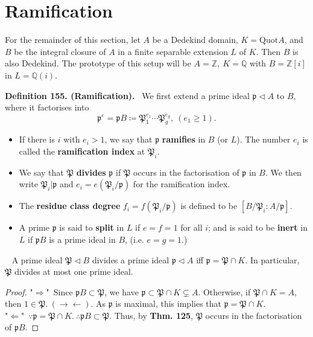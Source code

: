 \documentclass[12pt,a4paper,footinclude=true,headinclude=true]{scrbook} %
\newenvironment{lemma}[2][]
{\renewcommand\theinnercustomlemma{#2}\innercustomlemma[#1]
\begin{mdframed}[backgroundcolor=gray!20]\ }
{\end{mdframed}\endinnercustomprop}
\newenvironment{definition}[2][Definition]
    { \begin{mdframed}[backgroundcolor=gray!20] \textbf{#1 #2.}\ }
    {  \end{mdframed}}
\begin{document}
\section{Ramification}
For the remainder of this section, let $A$ be a Dedekind domain, $K=\mathrm{Quot}A$, and $B$ be the integral closure of $A$ in a finite separable extension $L$ of $K$. Then $B$ is also Dedekind. The prototype of this setup will be $A=\mathbb{Z},\ K=\mathbb{Q}$ with $B=\mathbb{Z}[i]$ in $L=\mathbb{Q}(i)$.

\begin{definition}{155. (Ramification)}
    We first extend a prime ideal $\mathfrak{p}\triangleleft A$ to $B$, where it factorises into 
    \begin{equation*}
        \mathfrak{p}^e=\mathfrak{p}B\coloneqq\mathfrak{P}_1^{e_1}\cdots
        \mathfrak{P}_g^{e_g},\ (e_1\geq1).
    \end{equation*}
    \begin{itemize}
        \item If there is $i$ with $e_i>1$, we say that $\mathfrak{p}$ \textbf{ramifies} in $B$ (or $L$). The number $e_i$ is called the \textbf{ramification index} at $\mathfrak{P}_i$.
        \item We say that $\mathfrak{P}$ \textbf{divides} $\mathfrak{p}$ if $\mathfrak{P}$ occurs in the factorisation of $\mathfrak{p}$ in $B$. We then write $\mathfrak{P}_i|\mathfrak{p}$ and $e_i=e(\mathfrak{P}_i/\mathfrak{p})$ for the ramification index. 
        \item The \textbf{residue class degree} $f_i=f(\mathfrak{P}_i/\mathfrak{p})$ is defined to be $[B/\mathfrak{P}_i:A/\mathfrak{p}]$.
        \item A prime $\mathfrak{p}$ is said to \textbf{split} in $L$ if $e=f=1$ for all $i$; and is said to be \textbf{inert} in $L$ if $\mathfrak{p}B$ is a prime ideal in $B$, (i.e. $e=g=1$.)
    \end{itemize}
\end{definition} 

\begin{lemma}{157}
    A prime ideal $\mathfrak{P}\triangleleft B$ divides a prime ideal $\mathfrak{p}\triangleleft A$ iff $\mathfrak{p}=\mathfrak{P}\cap K$. In particular, $\mathfrak{P}$ divides at most one prime ideal.
\end{lemma}
\begin{proof}
    "$\Rightarrow$"\ Since $\mathfrak{p}B\subset\mathfrak{P}$, we have $\mathfrak{p}\subset\mathfrak{P}\cap K\subsetneq A$. Otherwise, if $\mathfrak{P}\cap K=A$, then $1\in\mathfrak{P}.\ (\to\gets)$. As $\mathfrak{p}$ is maximal, this implies that $\mathfrak{p}=\mathfrak{P} \cap K$.\\ "$\Leftarrow$"\ $\because\mathfrak{p}=\mathfrak{P}\cap K.\ \therefore\mathfrak{p}B\subset\mathfrak{P}$. Thus, by \textbf{Thm. 125}, $\mathfrak{P}$ occurs in the factorisation of $\mathfrak{p}B$.
\end{proof}
\end{document}
